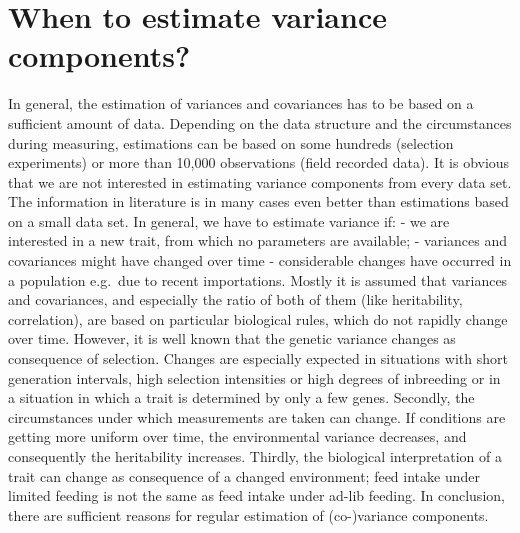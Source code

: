 \documentclass[
]{book}
\begin{document}
\hypertarget{when-to-estimate-variance-components}{%
\section{When to estimate variance components?}\label{when-to-estimate-variance-components}}

In general, the estimation of variances and covariances has to be based on a sufficient
amount of data. Depending on the data structure and the circumstances during
measuring, estimations can be based on some hundreds (selection experiments) or more
than 10,000 observations (field recorded data). It is obvious that we are not interested in
estimating variance components from every data set. The information in literature is in
many cases even better than estimations based on a small data set. In general, we have
to estimate variance if:
- we are interested in a new trait, from which no parameters are available;
- variances and covariances might have changed over time
- considerable changes have occurred in a population e.g.~due to recent
importations.
Mostly it is assumed that variances and covariances, and especially the ratio of both of
them (like heritability, correlation), are based on particular biological rules, which do
not rapidly change over time. However, it is well known that the genetic variance
changes as consequence of selection. Changes are especially expected in situations with
short generation intervals, high selection intensities or high degrees of inbreeding or in a
situation in which a trait is determined by only a few genes. Secondly, the
circumstances under which measurements are taken can change. If conditions are
getting more uniform over time, the environmental variance decreases, and
consequently the heritability increases. Thirdly, the biological interpretation of a trait
can change as consequence of a changed environment; feed intake under limited
feeding is not the same as feed intake under ad-lib feeding. In conclusion, there are
sufficient reasons for regular estimation of (co-)variance components.
\end{document}

